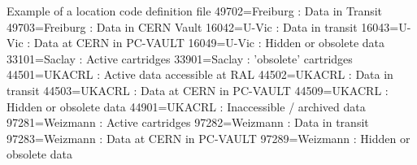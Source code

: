 \begin{XMPt}{Example of a location code definition file}
     49702=Freiburg    :   Data in Transit                                                                                          
     49703=Freiburg    :   Data in CERN Vault                                                                                       
     16042=U-Vic       :   Data in transit                                                                                          
     16043=U-Vic       :   Data at CERN in PC-VAULT                                                                                 
     16049=U-Vic       :   Hidden or obsolete data                                                                                  
     33101=Saclay      :   Active cartridges                                                                                        
     33901=Saclay      :   'obsolete' cartridges                                                                                    
     44501=UKACRL      :   Active data accessible at RAL                                                                            
     44502=UKACRL      :   Data in transit                                                                                          
     44503=UKACRL      :   Data at CERN in PC-VAULT                                                                                 
     44509=UKACRL      :   Hidden or obsolete data                                                                                  
     44901=UKACRL      :   Inaccessible / archived data                                                                             
     97281=Weizmann    :   Active cartridges                                                                                        
     97282=Weizmann    :   Data in transit                                                                                          
     97283=Weizmann    :   Data at CERN in PC-VAULT                                                                                 
     97289=Weizmann    :   Hidden or obsolete data                                                                                  
\end{XMPt}
